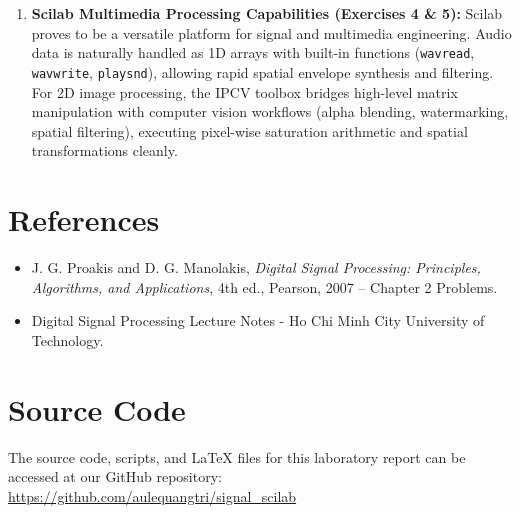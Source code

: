 \documentclass[12pt,a4paper]{article}
\begin{document}
\begin{enumerate}
    \item \textbf{Scilab Multimedia Processing Capabilities (Exercises 4 \& 5):}
    Scilab proves to be a versatile platform for signal and multimedia engineering. Audio data is naturally handled as 1D arrays with built-in functions (\texttt{wavread}, \texttt{wavwrite}, \texttt{playsnd}), allowing rapid spatial envelope synthesis and filtering. For 2D image processing, the IPCV toolbox bridges high-level matrix manipulation with computer vision workflows (alpha blending, watermarking, spatial filtering), executing pixel-wise saturation arithmetic and spatial transformations cleanly.
\end{enumerate}

\section{References}
\begin{itemize}
    \item J. G. Proakis and D. G. Manolakis, \emph{Digital Signal Processing: Principles, Algorithms, and Applications}, 4th ed., Pearson, 2007 -- Chapter 2 Problems.
    \item Digital Signal Processing Lecture Notes - Ho Chi Minh City University of Technology.
\end{itemize}

\section{Source Code}
The source code, scripts, and LaTeX files for this laboratory report can be accessed at our GitHub repository: \\
\url{https://github.com/aulequangtri/signal_scilab}
\end{document}
